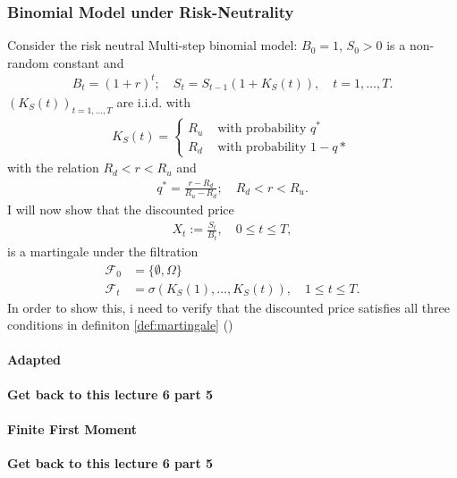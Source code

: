 \documentclass{article}
\theoremstyle{definition}
\numberwithin{equation}{section}
\newcommand{\taskcolor}{RedOrange}
\newcommand{\task}[1]{
    \begin{center}
        \colorbox{\taskcolor}{
            \textsf{
                \textbf{#1}
            }
        }
    \end{center}
}
\begin{document}
\subsubsection{Binomial Model under Risk-Neutrality}
Consider the risk neutral Multi-step binomial model: $B_0 = 1$, $S_0 > 0$ is a non-random constant and
\begin{align}
    B_t = (1 + r)^t; \quad S_t = S_{t-1}(1 + K_S(t)), \quad t = 1, \ldots, T. 
\end{align}
$(K_S(t))_{t = 1, \ldots, T}$ are i.i.d. with 
\begin{align}
    K_S(t) = 
    \begin{cases}
        R_u &\text{ with probability } q^* \\
        R_d &\text{ with probability } 1-q*
    \end{cases}
\end{align}
with the relation $R_d < r < R_u$ and
\begin{align}
    q^* = \frac{r - R_d}{R_u - R_d}; \quad R_d < r < R_u.
\end{align}
I will now show that the discounted price
\begin{align}
    X_t := \frac{S_t}{B_t}, \quad 0 \leq t \leq T, 
\end{align}
is a martingale under the filtration
\begin{align}
    \mathscr{F}_0 &= \{ \emptyset, \Omega\} \label{eq:information_at_time_0} \\
    \mathscr{F}_t &= \sigma(K_S(1), \ldots, K_S(t)), \quad 1 \leq t \leq T. \label{eq:information_at_time_1}  
\end{align}
In order to show this, i need to verify that the discounted price satisfies all three conditions in definiton \ref{def:martingale} ()
\paragraph{Adapted}
\task{Get back to this lecture 6 part 5}

\paragraph{Finite First Moment}
\task{Get back to this lecture 6 part 5}
\end{document}
